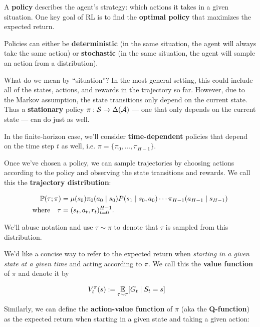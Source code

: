 \documentclass[../main/main]{subfiles}
\begin{document}
A \textbf{policy} describes the agent's strategy: which actions it takes in a given situation. One key goal of RL is to find the \textbf{optimal policy} that maximizes the expected return.

Policies can either be \textbf{deterministic} (in the same situation, the agent will always take the same action) or \textbf{stochastic} (in the same situation, the agent will sample an action from a distribution).

What do we mean by ``situation''? In the most general setting, this could include all of the states, actions, and rewards in the trajectory so far. However, due to the Markov assumption, the state transitions only depend on the current state. Thus a \textbf{stationary} policy $\pi : \S \to \Delta(\A)$ --- one that only depends on the current state --- can do just as well.

In the finite-horizon case, we'll consider \textbf{time-dependent} policies that depend on the time step $t$ as well, i.e. $\pi = \{ \pi_0, \dots, \pi_{H-1} \}$.

Once we've chosen a policy, we can sample trajectories by choosing actions according to the policy and observing the state transitions and rewards. We call this the \textbf{trajectory distribution}:

\begin{align*}
    \P(\tau ; \pi) &= \mu(s_0) \pi_0(a_0 \mid s_0) P(s_1 \mid s_0, a_0) \cdots \pi_{H-1}(a_{H-1} \mid s_{H-1}) \\
    \text{where} \quad \tau &= (s_t, a_t, r_t)_{t=0}^{H-1}.
\end{align*}

We'll abuse notation and use $\tau \sim \pi$ to denote that $\tau$ is sampled from this distribution.

We'd like a concise way to refer to the expected return when \emph{starting in a given state at a given time} and acting according to $\pi$. We call this the \textbf{value function} of $\pi$ and denote it by

\begin{align*}
    V_t^\pi(s) &:= \E_{\tau \sim \pi} [G_t \mid S_t = s] %
\end{align*}


Similarly, we can define the \textbf{action-value function} of $\pi$ (aka the \textbf{Q-function}) as the expected return when starting in a given state and taking a given action:
\end{document}
